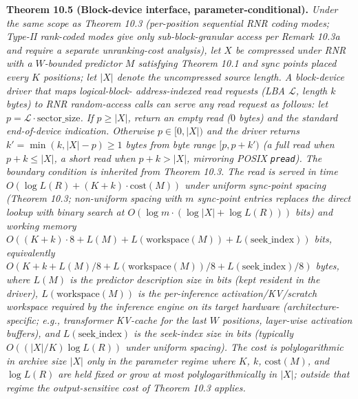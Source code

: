 \documentclass[
]{article}
\begin{document}
\textbf{Theorem 10.5 (Block-device interface, parameter-conditional).}
\emph{Under the same scope as Theorem 10.3 (per-position sequential
RNR coding modes; Type-II rank-coded modes give only
sub-block-granular access per Remark 10.3a and require a separate
unranking-cost analysis), let $X$ be compressed under RNR with a
$W$-bounded predictor $M$ satisfying Theorem 10.1 and sync points
placed every $K$ positions; let $|X|$ denote the uncompressed
source length. A block-device driver that maps logical-block-
address-indexed read requests (LBA $\mathcal{L}$, length $k$ bytes)
to RNR random-access calls can serve any read request as follows: let $p = \mathcal{L}
\cdot \text{sector\_size}$. If $p \geq |X|$, return an empty read
($0$ bytes) and the standard end-of-device indication. Otherwise
$p \in [0, |X|)$ and the driver returns $k' = \min(k, |X| - p)
\geq 1$ bytes from byte range $[p, p+k')$ (a full read when
$p+k \leq |X|$, a short read when $p+k > |X|$, mirroring POSIX
\texttt{pread}). The boundary condition is inherited from Theorem
10.3. The read is served in time
$O(\log L(R) + (K + k) \cdot \mathrm{cost}(M))$ under uniform
sync-point spacing (Theorem 10.3; non-uniform spacing with $m$
sync-point entries replaces the direct lookup with binary search
at $O(\log m \cdot (\log |X| + \log L(R)))$ bits) and
working memory $O((K + k) \cdot 8 + L(M) + L(\mathrm{workspace}(M))
+ L(\mathrm{seek\_index}))$ \emph{bits}, equivalently
$O(K + k + L(M)/8 + L(\mathrm{workspace}(M))/8 +
L(\mathrm{seek\_index})/8)$ \emph{bytes}, where $L(M)$ is the
predictor description size in bits (kept resident in the driver),
$L(\mathrm{workspace}(M))$ is the per-inference activation/KV/scratch
workspace required by the inference engine on its target hardware
(architecture-specific; e.g., transformer KV-cache for the last
$W$ positions, layer-wise activation buffers), and
$L(\mathrm{seek\_index})$ is the seek-index size in bits (typically
$O((|X|/K) \log L(R))$ under uniform spacing). The cost is polylogarithmic in
archive size $|X|$ only in the parameter regime where $K$, $k$,
$\mathrm{cost}(M)$, and $\log L(R)$ are held fixed or grow at most
polylogarithmically in $|X|$; outside that regime the
output-sensitive cost of Theorem 10.3 applies.}
\end{document}
